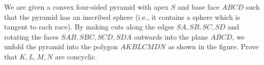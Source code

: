 We are given a convex four-sided pyramid with apex $S$ and base face $ABCD$ such that the pyramid has an inscribed sphere (i.e., it contains a sphere which is tangent to each race). By making cuts along the edges $SA,SB,SC,SD$ and rotating the faces $SAB,SBC,SCD,SDA$ outwards into the plane $ABCD$,  we unfold the pyramid into the polygon $AKBLCMDN$ as shown in the figure. Prove that $K,L,M,N$ are concyclic.

\begin{center}
\def\svgwidth{0.5\textwidth}

\end{center}
